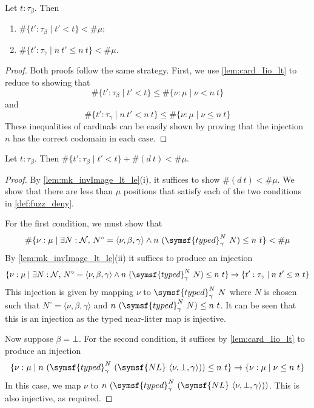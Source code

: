 \begin{lemma}
    \label{lem:mk_invImage_lt_le}
    Let \( t : \tau_\beta \).
    Then
    \begin{enumerate}
        \item \( \#\{ t' : \tau_\beta \mid t' < t \} < \#\mu \);
        \item \( \#\{ t' : \tau_\gamma \mid n\ t' \leq n\ t \} < \#\mu \).
    \end{enumerate}
\end{lemma}
\begin{proof}
    Both proofs follow the same strategy.
    First, we use \cref{lem:card_Iio_lt} to reduce to showing that
    \[ \#\{ t' : \tau_\beta \mid t' < t \} \leq \#\{ \nu : \mu \mid \nu < n\ t \} \]
    and
    \[ \#\{ t' : \tau_\gamma \mid n\ t' < n\ t \} \leq \#\{ \nu : \mu \mid \nu \leq n\ t \} \]
    These inequalities of cardinals can be easily shown by proving that the injection \( n \) has the correct codomain in each case.
\end{proof}
\begin{lemma}
    \label{lem:mk_fuzz_deny}
    Let \( t : \tau_\beta \).
    Then \( \#\{ t' : \tau_\beta \mid t' < t \} + \#(d\ t) < \#\mu \).
\end{lemma}
\begin{proof}
    By \cref{lem:mk_invImage_lt_le}(i), it suffices to show \( \#(d\ t) < \#\mu \).
    We show that there are less than \( \mu \) positions that satisfy each of the two conditions in \cref{def:fuzz_deny}.

    For the first condition, we must show that
    \[ \#\{ \nu : \mu \mid \exists N : \mathcal N,\, N^\circ = \langle \nu, \beta, \gamma \rangle \wedge n\ (\symsf{typed}^N_\gamma\ N) \leq n\ t \} < \#\mu \]
    By \cref{lem:mk_invImage_lt_le}(ii) it suffices to produce an injection
    \[ \{ \nu : \mu \mid \exists N : \mathcal N,\, N^\circ = \langle \nu, \beta, \gamma \rangle \wedge n\ (\symsf{typed}^N_\gamma\ N) \leq n\ t \} \to \{ t' : \tau_\gamma \mid n\ t' \leq n\ t \} \]
    This injection is given by mapping \( \nu \) to \( \symsf{typed}^N_\gamma\ N \) where \( N \) is chosen such that \( N^\circ = \langle \nu, \beta, \gamma \rangle \) and \( n\ (\symsf{typed}^N_\gamma\ N) \leq n\ t \).
    It can be seen that this is an injection as the typed near-litter map is injective.

    Now suppose \( \beta = \bot \).
    For the second condition, it suffices by \cref{lem:card_Iio_lt} to produce an injection
    \[ \{ \nu : \mu \mid n\ (\symsf{typed}^N_\gamma\ (\symsf{NL}\ \langle \nu, \bot, \gamma \rangle)) \leq n\ t \} \to \{ \nu : \mu \mid \nu \leq n\ t \} \]
    In this case, we map \( \nu \) to \( n\ (\symsf{typed}^N_\gamma\ (\symsf{NL}\ \langle \nu, \bot, \gamma \rangle)) \).
    This is also injective, as required.
\end{proof}
